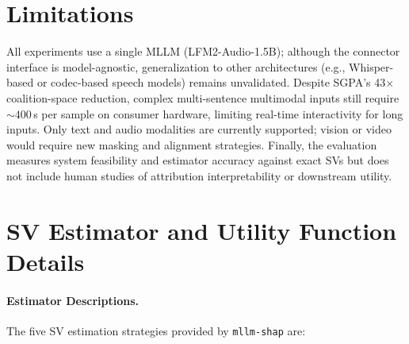 \documentclass[11pt]{article}
\begin{document}
\section*{Limitations}
All experiments use a single MLLM (LFM2-Audio-1.5B); although the connector interface is model-agnostic, generalization to other architectures (e.g., Whisper-based or codec-based speech models) remains unvalidated.
Despite SGPA's 43$\times$ coalition-space reduction, complex multi-sentence multimodal inputs still require ${\sim}400$\,s per sample on consumer hardware, limiting real-time interactivity for long inputs.
Only text and audio modalities are currently supported; vision or video would require new masking and alignment strategies.
Finally, the evaluation measures system feasibility and estimator accuracy against exact SVs but does not include human studies of attribution interpretability or downstream utility.

\setlength{\bibsep}{0pt plus 0.3ex}


\appendix

\section{SV Estimator and Utility Function Details}
\label{app:estimators}

\paragraph{Estimator Descriptions.}
The five SV estimation strategies provided by \texttt{mllm-shap} are:
\end{document}
